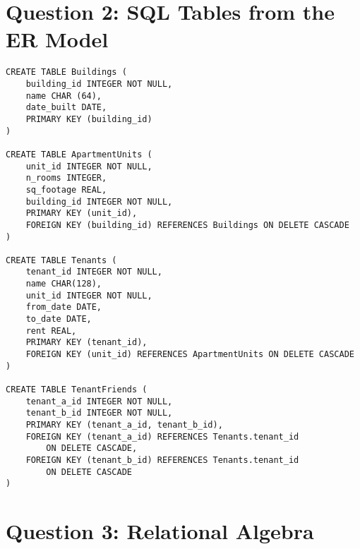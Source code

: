 \documentclass{article}
\begin{document}
\newpage

\section*{Question 2: SQL Tables from the ER Model}

\begin{verbatim}
CREATE TABLE Buildings (
    building_id INTEGER NOT NULL,
    name CHAR (64),
    date_built DATE,
    PRIMARY KEY (building_id)
)

CREATE TABLE ApartmentUnits (
    unit_id INTEGER NOT NULL,
    n_rooms INTEGER,
    sq_footage REAL,
    building_id INTEGER NOT NULL,
    PRIMARY KEY (unit_id),
    FOREIGN KEY (building_id) REFERENCES Buildings ON DELETE CASCADE
)

CREATE TABLE Tenants (
    tenant_id INTEGER NOT NULL,
    name CHAR(128),
    unit_id INTEGER NOT NULL,
    from_date DATE,
    to_date DATE,
    rent REAL,
    PRIMARY KEY (tenant_id),
    FOREIGN KEY (unit_id) REFERENCES ApartmentUnits ON DELETE CASCADE
)

CREATE TABLE TenantFriends (
    tenant_a_id INTEGER NOT NULL,
    tenant_b_id INTEGER NOT NULL,
    PRIMARY KEY (tenant_a_id, tenant_b_id),
    FOREIGN KEY (tenant_a_id) REFERENCES Tenants.tenant_id
        ON DELETE CASCADE,
    FOREIGN KEY (tenant_b_id) REFERENCES Tenants.tenant_id
        ON DELETE CASCADE
)
\end{verbatim}

\newpage

\section*{Question 3: Relational Algebra}
\end{document}
